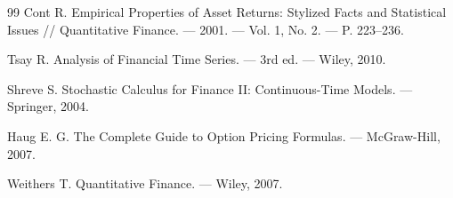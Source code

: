 \documentclass[11pt,a4paper]{article}
\begin{document}
\begin{thebibliography}{99}
Cont R. Empirical Properties of Asset Returns: Stylized Facts and Statistical Issues // Quantitative Finance. --- 2001. --- Vol. 1, No. 2. --- P. 223--236.

Tsay R. Analysis of Financial Time Series. --- 3rd ed. --- Wiley, 2010.

Shreve S. Stochastic Calculus for Finance II: Continuous-Time Models. --- Springer, 2004.

Haug E. G. The Complete Guide to Option Pricing Formulas. --- McGraw-Hill, 2007.

Weithers T. Quantitative Finance. --- Wiley, 2007.

\end{thebibliography}
\end{document}
